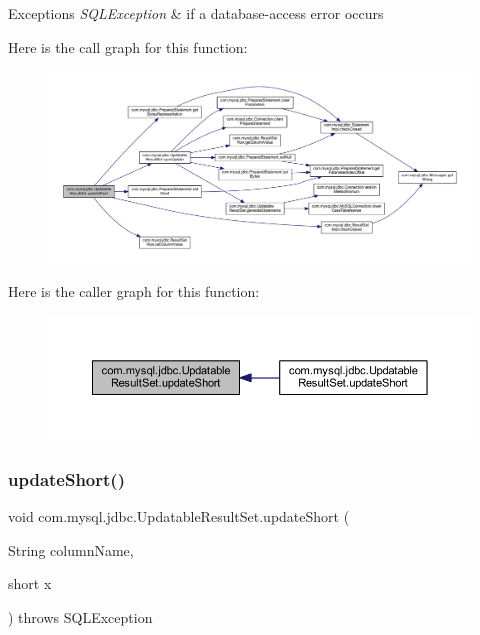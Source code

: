 \begin{DoxyExceptions}{Exceptions}
{\em S\+Q\+L\+Exception} & if a database-\/access error occurs \\
\hline
\end{DoxyExceptions}
Here is the call graph for this function\+:
\nopagebreak
\begin{figure}[H]
\begin{center}
\leavevmode
\includegraphics[width=350pt]{classcom_1_1mysql_1_1jdbc_1_1_updatable_result_set_a0ff435a274f3c9b111fe0733274b1a48_cgraph}
\end{center}
\end{figure}
Here is the caller graph for this function\+:
\nopagebreak
\begin{figure}[H]
\begin{center}
\leavevmode
\includegraphics[width=350pt]{classcom_1_1mysql_1_1jdbc_1_1_updatable_result_set_a0ff435a274f3c9b111fe0733274b1a48_icgraph}
\end{center}
\end{figure}
\mbox{\label{classcom_1_1mysql_1_1jdbc_1_1_updatable_result_set_a6bbe60d1c6cc1b5d6b413b47eedfddf6}} 
\subsubsection{\texorpdfstring{update\+Short()}{updateShort()}\hspace{0.1cm}{\footnotesize\ttfamily [2/2]}}
{\footnotesize\ttfamily void com.\+mysql.\+jdbc.\+Updatable\+Result\+Set.\+update\+Short (\begin{DoxyParamCaption}\item[{String}]{column\+Name,  }\item[{short}]{x }\end{DoxyParamCaption}) throws S\+Q\+L\+Exception}

